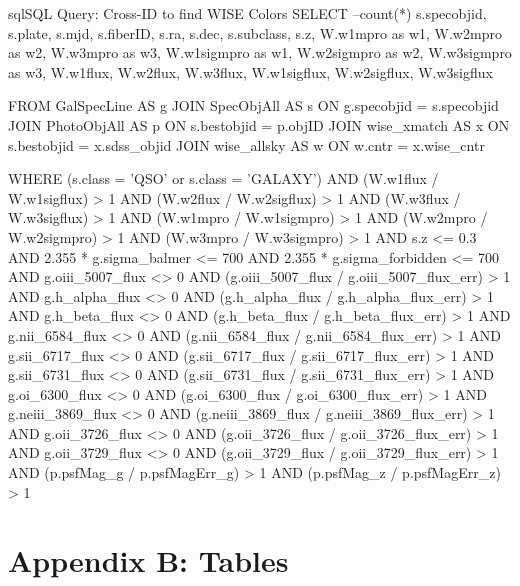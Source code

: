 \documentclass[letterpaper, oneside]{article}
\begin{document}
\begin{sourcecode}[\label{wise_crossid_query}]{sql}{SQL Query: Cross-ID to find WISE Colors}
SELECT --count(*)
s.specobjid, s.plate, s.mjd, s.fiberID, 
s.ra, s.dec, s.subclass, s.z, 
W.w1mpro as w1, W.w2mpro as w2, W.w3mpro as w3, 
W.w1sigmpro as w1, W.w2sigmpro as w2, W.w3sigmpro as w3, 
W.w1flux, W.w2flux, W.w3flux, 
W.w1sigflux, W.w2sigflux, W.w3sigflux

FROM GalSpecLine AS g 
JOIN SpecObjAll AS s ON g.specobjid = s.specobjid
JOIN PhotoObjAll AS p ON s.bestobjid = p.objID
JOIN wise_xmatch AS x ON s.bestobjid = x.sdss_objid JOIN wise_allsky AS w ON w.cntr = x.wise_cntr

WHERE
(s.class = 'QSO' or s.class = 'GALAXY')
AND (W.w1flux / W.w1sigflux) > 1
AND (W.w2flux / W.w2sigflux) > 1
AND (W.w3flux / W.w3sigflux) > 1
AND (W.w1mpro / W.w1sigmpro) > 1
AND (W.w2mpro / W.w2sigmpro) > 1
AND (W.w3mpro / W.w3sigmpro) > 1
AND s.z <= 0.3
AND 2.355 * g.sigma_balmer <= 700
AND 2.355 * g.sigma_forbidden <= 700
AND g.oiii_5007_flux <> 0
AND (g.oiii_5007_flux / g.oiii_5007_flux_err) > 1
AND g.h_alpha_flux <> 0
AND (g.h_alpha_flux / g.h_alpha_flux_err) > 1
AND g.h_beta_flux <> 0
AND (g.h_beta_flux / g.h_beta_flux_err) > 1
AND g.nii_6584_flux <> 0
AND (g.nii_6584_flux / g.nii_6584_flux_err) > 1
AND g.sii_6717_flux <> 0
AND (g.sii_6717_flux / g.sii_6717_flux_err) > 1
AND g.sii_6731_flux <> 0
AND (g.sii_6731_flux / g.sii_6731_flux_err) > 1
AND g.oi_6300_flux <> 0
AND (g.oi_6300_flux / g.oi_6300_flux_err) > 1
AND g.neiii_3869_flux <> 0
AND (g.neiii_3869_flux / g.neiii_3869_flux_err) > 1
AND g.oii_3726_flux <> 0
AND (g.oii_3726_flux / g.oii_3726_flux_err) > 1
AND g.oii_3729_flux <> 0
AND (g.oii_3729_flux / g.oii_3729_flux_err) > 1
AND (p.psfMag_g / p.psfMagErr_g) > 1
AND (p.psfMag_z / p.psfMagErr_z) > 1
\end{sourcecode}

\section*{Appendix B: Tables}

% 



\end{document}
